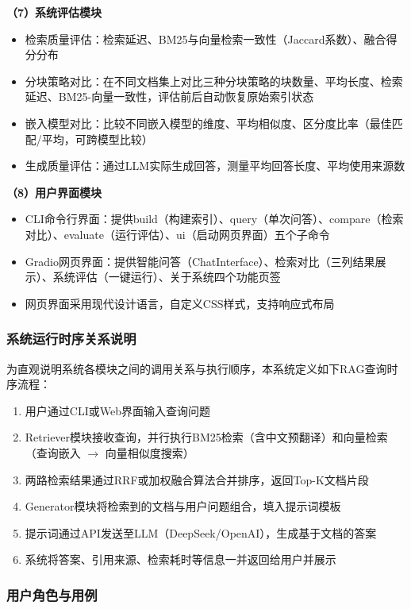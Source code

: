 \documentclass[10pt,a4paper]{article}
\begin{document}
\textbf{（7）系统评估模块}
\begin{itemize}
\item 检索质量评估：检索延迟、BM25与向量检索一致性（Jaccard系数）、融合得分分布
\item 分块策略对比：在不同文档集上对比三种分块策略的块数量、平均长度、检索延迟、BM25-向量一致性，评估前后自动恢复原始索引状态
\item 嵌入模型对比：比较不同嵌入模型的维度、平均相似度、区分度比率（最佳匹配/平均，可跨模型比较）
\item 生成质量评估：通过LLM实际生成回答，测量平均回答长度、平均使用来源数
\end{itemize}

\textbf{（8）用户界面模块}
\begin{itemize}
\item CLI命令行界面：提供build（构建索引）、query（单次问答）、compare（检索对比）、evaluate（运行评估）、ui（启动网页界面）五个子命令
\item Gradio网页界面：提供智能问答（ChatInterface）、检索对比（三列结果展示）、系统评估（一键运行）、关于系统四个功能页签
\item 网页界面采用现代设计语言，自定义CSS样式，支持响应式布局
\end{itemize}

\subsubsection{系统运行时序关系说明}

为直观说明系统各模块之间的调用关系与执行顺序，本系统定义如下RAG查询时序流程：

\begin{enumerate}[label=(\arabic*)]
\item 用户通过CLI或Web界面输入查询问题
\item Retriever模块接收查询，并行执行BM25检索（含中文预翻译）和向量检索（查询嵌入 $\to$ 向量相似度搜索）
\item 两路检索结果通过RRF或加权融合算法合并排序，返回Top-K文档片段
\item Generator模块将检索到的文档与用户问题组合，填入提示词模板
\item 提示词通过API发送至LLM（DeepSeek/OpenAI），生成基于文档的答案
\item 系统将答案、引用来源、检索耗时等信息一并返回给用户并展示
\end{enumerate}

\subsubsection{用户角色与用例}
\end{document}
